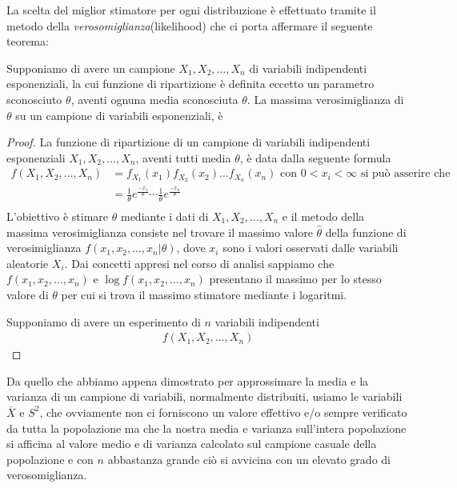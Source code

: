 \documentclass[a4paper,12pt, oneside]{book}
\begin{document}
La scelta del miglior stimatore per ogni distribuzione è effettuato tramite il metodo della
\emph{verosomiglianza}(likelihood) che ci porta affermare il seguente teorema:
\begin{teo}
    Supponiamo di avere un campione $X_1, X_2, \dots, X_n$ di variabili indipendenti esponenziali, la cui funzione
    di ripartizione è definita eccetto un parametro sconosciuto $\theta$, aventi ognuna media sconosciuta $\theta$.\newline
    La massima verosimiglianza di $\theta$ su un campione di variabili esponenziali, è

\end{teo}
\begin{proof}
    La funzione di ripartizione di un campione di variabili indipendenti esponenziali $X_1, X_2, \dots, X_n$, aventi 
    tutti media $\theta$, è data dalla seguente formula
    \[ \begin{split}
        f(X_1, X_2, \dots, X_n) & = f_{X_1}(x_1) f_{X_2}(x_2) \dots f_{X_n}(x_n) \mbox{ con $0 < x_i <\infty$ si può asserire che}\\
                                & = \frac{1}{\theta}e^{\frac{-x_1}{\theta}} \cdots \frac{1}{\theta} e^{\frac{-x_n}{\theta}}\\
       \end{split} \]
    L'obiettivo è stimare $\theta$ mediante i dati di $X_1, X_2, \dots, X_n$ e il metodo della massima verosimiglianza
    consiste nel trovare il massimo valore $\hat{\theta}$ della funzione di verosimiglianza $f(x_1, x_2, \dots, x_n | \theta)$, dove
    $x_i$ sono i valori osservati dalle variabili aleatorie $X_i$.\newline
    Dai concetti appresi nel corso di analisi sappiamo che $f(x_1, x_2, \dots, x_n)$ e $\log f(x_1, x_2, \dots, x_n)$
    presentano il massimo per lo stesso valore di $\theta$ per cui si trova il massimo stimatore mediante i logaritmi.

    Supponiamo di avere un esperimento di $n$ variabili indipendenti 
    \[ \begin{split}
        f(X_1, X_2, \dots, X_n)
       \end{split} \]
    \end{proof}
Da quello che abbiamo appena dimostrato per approssimare la media e la varianza di un campione di variabili, normalmente
distribuiti, usiamo le variabili $\bar{X}$ e $S^2$, che ovviamente non ci forniscono un valore effettivo e/o sempre
verificato da tutta la popolazione ma che la nostra media e varianza sull'intera popolazione si afficina al valore medio
e di varianza calcolato sul campione casuale della popolazione e con $n$ abbastanza grande ciò si avvicina con un
elevato grado di verosomiglianza.
\end{document}
